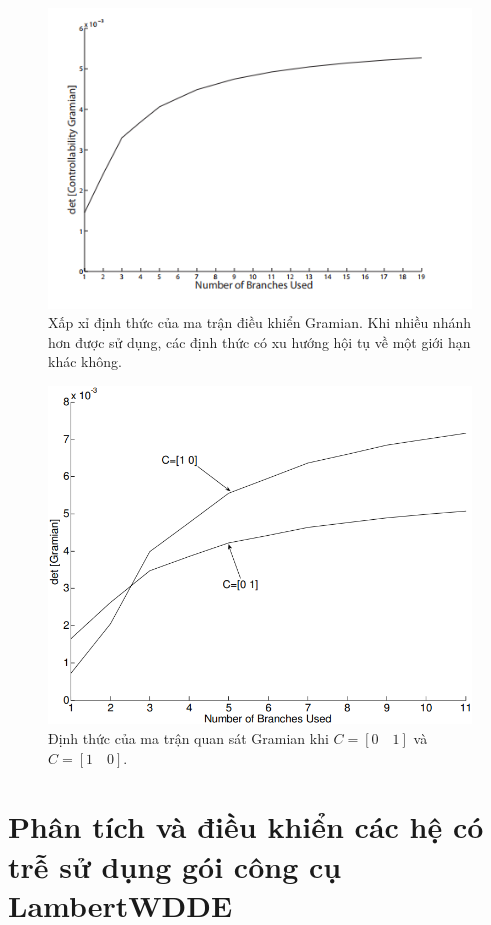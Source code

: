 \documentclass[10pt,notheorems]{beamer}
\theoremstyle{definition}
\theoremstyle{definition}
\theoremstyle{definition}
\begin{document}
\begin{frame}
\begin{minipage}{6.5cm} 
	\begin{figure}[t]
		\centering
		\includegraphics[width=0.7\linewidth]{hinh/hinh2n}
		\caption{Xấp xỉ định thức của ma trận điều khiển Gramian. Khi nhiều nhánh hơn được sử dụng, các định thức có xu hướng hội tụ về một giới hạn khác không.}
		\label{n.refhinh2}
	\end{figure} 
\end{minipage}
\hfill
\begin{minipage}{5cm}
	\begin{figure}[t]
		\centering
		\includegraphics[width=0.6\linewidth]{hinh/hinh3n}
		\caption{Định thức của ma trận quan sát Gramian khi $C=[0\quad 1]$ và $C=[1\quad 0]$.}
		\label{n.refhinh3}
	\end{figure}   
\end{minipage}

\end{frame}


\section{Phân tích và điều khiển các hệ có trễ sử dụng gói công cụ LambertWDDE}
\end{document}
